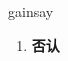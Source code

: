 
\begin{frame}
{\huge gainsay}
\begin{center}
\begin{enumerate}\Large
  \item \textbf{否认}
\end{enumerate}
\end{center}
\end{frame}
